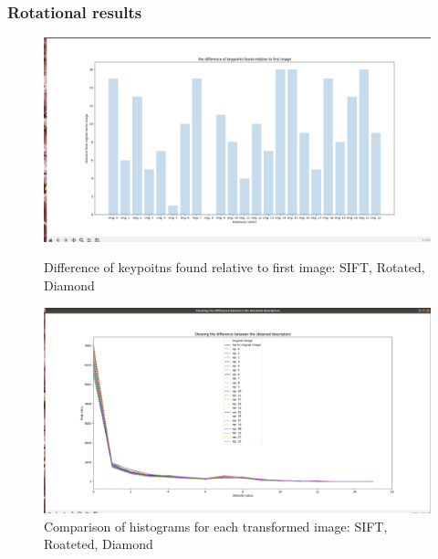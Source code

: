 \documentclass[conference]{IEEEtran}
\begin{document}
\subsubsection{Rotational results}

\begin{figure}[!htb]
  \centering
  \begin{minipage}[t]{0.45\textwidth}
    \includegraphics[width=\textwidth]{../programme/results/Task_1/rotated_experiements/SIFT/diamond/experiment_one_difference_found_kp.png}

    \caption{Difference of keypoitns found relative to first image: SIFT, Rotated, Diamond}
    \label{Difference of keypoitns found relative to first image: SIFT, Rotated, Diamond}
  \end{minipage}
  \hfill
  \begin{minipage}[t]{0.45\textwidth}
    \includegraphics[width=\textwidth]{../programme/results/Task_1/rotated_experiements/SIFT/diamond/experiment_two_plotting_histograms.png}
    \caption{Comparison of histograms for each transformed image: SIFT, Roateted, Diamond}
    \label{Comparison of histograms for each transformed image: SIFT, Roateted, Diamond}
  \end{minipage}
\end{figure}
\end{document}
